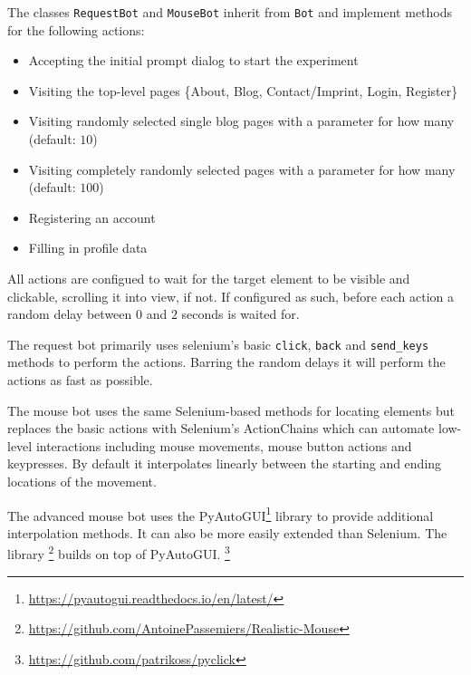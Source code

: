 \documentclass[
    fontsize=12pt,
    headings=small,
    parskip=half,           %
    bibliography=totoc,
    numbers=noenddot,       %
    open=any,               %
    final                   %
]{scrreprt}
\begin{document}
The classes \lstinline{RequestBot} and \lstinline{MouseBot} inherit from \lstinline{Bot} and implement methods for the following actions:

\begin{itemize}
	\item Accepting the initial prompt dialog to start the experiment
	\item Visiting the top-level pages \{About, Blog, Contact/Imprint, Login, Register\}
	\item Visiting randomly selected single blog pages with a parameter for how many (default: $10$)
	\item Visiting completely randomly selected pages with a parameter for how many (default: $100$)
	\item Registering an account
	\item Filling in profile data
\end{itemize}

All actions are configued to wait for the target element to be visible and clickable, scrolling it into view, if not. If configured as such, before each action a random delay between $0$ and $2$ seconds is waited for.


The request bot primarily uses selenium's basic \lstinline{click}, \lstinline{back} and \lstinline{send_keys} methods to perform the actions. Barring the random delays it will perform the actions as fast as possible.


The mouse bot uses the same Selenium-based methods for locating elements but replaces the basic actions with Selenium's ActionChains which can automate low-level interactions including mouse movements, mouse button actions and keypresses. By default it interpolates linearly between the starting and ending locations of the movement.

The advanced mouse bot uses the PyAutoGUI\footnote{\url{https://pyautogui.readthedocs.io/en/latest/}} library to provide additional interpolation methods. It can also be more easily extended than Selenium.
The library \footnote{\url{https://github.com/AntoinePassemiers/Realistic-Mouse}} builds on top of PyAutoGUI.
\footnote{\url{https://github.com/patrikoss/pyclick}}
\end{document}
